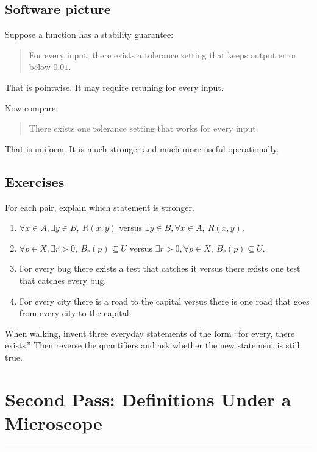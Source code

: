 \documentclass[12pt]{article}
\newcommand{\chapterline}{\vspace{0.4em}\hrule\vspace{0.8em}}
\begin{document}
\subsection{Software picture}

Suppose a function has a stability guarantee:

\begin{quote}
For every input, there exists a tolerance setting that keeps output error below $0.01$.
\end{quote}

That is pointwise. It may require retuning for every input.

Now compare:

\begin{quote}
There exists one tolerance setting that works for every input.
\end{quote}

That is uniform. It is much stronger and much more useful operationally.

\subsection{Exercises}

For each pair, explain which statement is stronger.

\begin{enumerate}
\item $\forall x\in A,\exists y\in B,\ R(x,y)$ versus $\exists y\in B,\forall x\in A,\ R(x,y)$.
\item $\forall p\in X,\exists r>0,\ B_r(p)\subseteq U$ versus $\exists r>0,\forall p\in X,\ B_r(p)\subseteq U$.
\item For every bug there exists a test that catches it versus there exists one test that catches every bug.
\item For every city there is a road to the capital versus there is one road that goes from every city to the capital.
\end{enumerate}

\begin{walkbox}
When walking, invent three everyday statements of the form ``for every, there exists.'' Then reverse the quantifiers and ask whether the new statement is still true.
\end{walkbox}

\newpage
\section{Second Pass: Definitions Under a Microscope}
\chapterline
\end{document}
